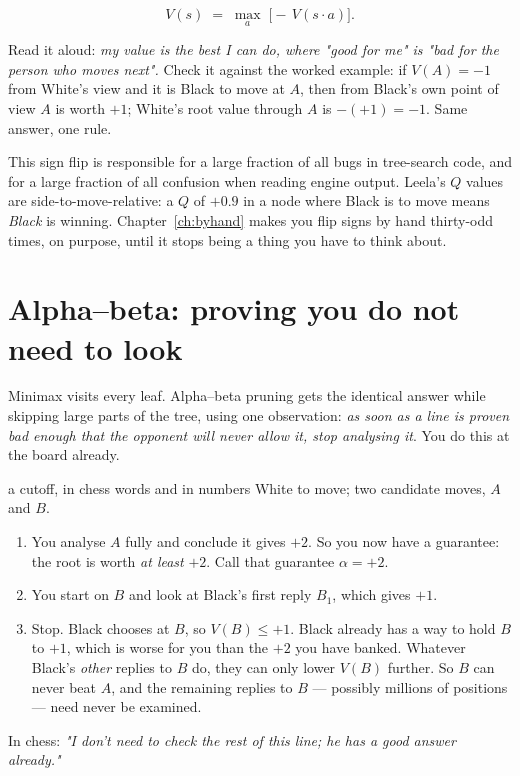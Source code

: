 \begin{equation}
  \label{eq:negamax}
  V(s) \;=\; \max_{a}\;\bigl[-\,V(s\!\cdot\!a)\bigr].
\end{equation}

Read it aloud: \emph{my value is the best I can do, where "good for me" is "bad for the
person who moves next".} Check it against the worked example: if $V(A) = -1$ from White's
view and it is Black to move at $A$, then from Black's own point of view $A$ is worth $+1$;
White's root value through $A$ is $-(+1) = -1$. Same answer, one rule.

\begin{pitfall}
This sign flip is responsible for a large fraction of all bugs in tree-search code, and for
a large fraction of all confusion when reading engine output. Leela's $Q$ values are
side-to-move-relative: a $Q$ of $+0.9$ in a node where Black is to move means \emph{Black}
is winning. Chapter~\ref{ch:byhand} makes you flip signs by hand thirty-odd times, on
purpose, until it stops being a thing you have to think about.
\end{pitfall}

\section{Alpha--beta: proving you do not need to look}

Minimax visits every leaf. Alpha--beta pruning gets the identical answer while skipping
large parts of the tree, using one observation: \emph{as soon as a line is proven bad enough
that the opponent will never allow it, stop analysing it}. You do this at the board already.

\begin{worked}{a cutoff, in chess words and in numbers}
White to move; two candidate moves, $A$ and $B$.
\begin{enumerate}
\item You analyse $A$ fully and conclude it gives $+2$. So you now have a guarantee: the
  root is worth \emph{at least} $+2$. Call that guarantee $\alpha = +2$.
\item You start on $B$ and look at Black's first reply $B_1$, which gives $+1$.
\item Stop. Black chooses at $B$, so $V(B) \le +1$. Black already has a way to hold $B$ to
  $+1$, which is worse for you than the $+2$ you have banked. Whatever Black's \emph{other}
  replies to $B$ do, they can only lower $V(B)$ further. So $B$ can never beat $A$, and the
  remaining replies to $B$ --- possibly millions of positions --- need never be examined.
\end{enumerate}
In chess: \emph{"I don't need to check the rest of this line; he has a good answer already."}
\end{worked}

